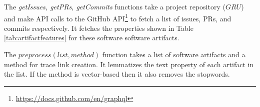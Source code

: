 The \textit{getIssues, getPRs, getCommits} functions take a project repository  ($GRU$) and make API calls to the GitHub API\footnote{\url{https://docs.github.com/en/graphql}} to fetch a list of issues, PRs, and commits respectively. 
It fetches the properties shown in Table \ref{tab:artifactfeatures} for these software software artifacts. 

The \textit{$preprocess(list, method)$}  function takes  a list of software artifacts and a method for trace link creation. 
It lemmatizes the text property of each artifact in the list. 
If the method is vector-based then it also removes the stopwords. 

